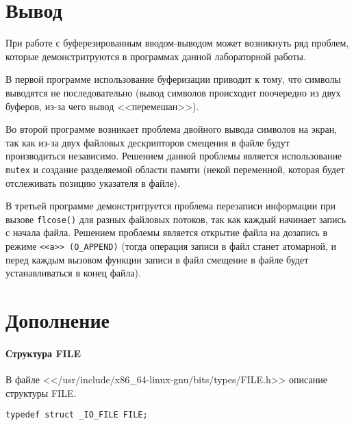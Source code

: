 

\chapter*{Вывод}

При работе с буферезированным вводом-выводом может возникнуть ряд проблем, которые демонстритруются в программах данной лабораторной работы. 

В первой программе использование буферизации приводит к тому, что символы выводятся не последовательно (вывод символов происходит поочередно из двух буферов, из-за чего вывод <<перемешан>>).

Во второй программе возникает проблема двойного вывода символов на экран, так как из-за двух файловых дескрипторов смещения в файле будут производиться независимо. Решением данной проблемы является использование \texttt{mutex} и создание разделяемой области памяти (некой переменной, которая будет отслеживать позицию указателя в файле).

В третьей программе демонстритруется проблема перезаписи информации при вызове \texttt{flcose()} для разных файловых потоков, так как каждый начинает запись с начала файла. Решением проблемы является открытие файла на дозапись в режиме \texttt{<<a>> (O\_APPEND)} (тогда операция записи в файл станет атомарной, и перед каждым вызовом функции записи в файл смещение в файле будет устанавливаться в конец файла).


\chapter*{Дополнение}

\subsubsection{Структура FILE}

В файле <</usr/include/x86\_64-linux-gnu/bits/types/FILE.h>> описание структуры FILE.

\begin{lstlisting}
typedef struct _IO_FILE FILE;
\end{lstlisting}

